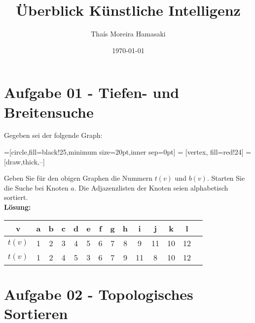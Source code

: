 \documentclass[fleqn]{article}
\title{Überblick Künstliche Intelligenz}
\author{Thaís Moreira Hamasaki}
\date{\today}
\numberwithin{equation}{section}
\numberwithin{figure}{section}
\numberwithin{table}{section}
\begin{document}
  \lstset{language=Haskell,frame=single,basicstyle=\small\ttfamily,numbers=left,firstnumber=1}
  \lstset{language=Prolog,frame=single,basicstyle=\small\ttfamily,numbers=left,firstnumber=1}

\section{Aufgabe 01 - Tiefen- und Breitensuche}

Gegeben sei der folgende Graph:\\
\bigskip

=[circle,fill=black!25,minimum size=20pt,inner sep=0pt]
 = [vertex, fill=red!24]
 = [draw,thick,--]

\bigskip

Geben Sie für den obigen Graphen die Nummern $t(v)$ und $b(v)$. Starten  Sie  die  Suche  bei  Knoten $a$.  Die Adjazenzlisten der Knoten seien alphabetisch sortiert.\\


\textbf{Lösung:}\\
\bigskip
\begin{tabular}{c|c c c c c c c c c c c c c}
  v & a & b & c & d & e & f & g & h & i & j & k & l \\
  \hline
  $t(v)$ & 1 & 2 & 3 & 4 & 5 & 6 & 7 & 8 & 9 & 11 & 10 & 12\\
  $t(v)$ & 1 & 2 & 4 & 5 & 3 & 6 & 7 & 9 & 11 & 8 & 10 & 12\\
\end{tabular}

\section{Aufgabe 02 - Topologisches Sortieren}
\end{document}
